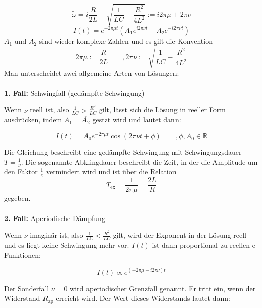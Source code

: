 \begin{equation*}
    \tilde{\omega} = i \frac{R}{2L} \pm \sqrt{\frac{1}{LC} - \frac{R^2}{4L^2}} := i2 \pi \mu \pm 2\pi \nu
\end{equation*}
\begin{equation}
    \label{eqn:RLC_lsg}
    I(t) = e^{-2 \pi \mu t} (A_1e^{i2 \pi \nu t} + A_2e^{-i2 \pi \nu t})
\end{equation}
$A_1$ und $A_2$ sind wieder komplexe Zahlen und es gilt die Konvention 
\begin{equation}
    \label{eqn:def_mu_nu}
    2\pi \mu := \frac{R}{2L} \qquad , 2\pi \nu := \sqrt{\frac{1}{LC}- \frac{R^2}{4L^2}}
\end{equation}
Man unterscheidet zwei allgemeine Arten von Lösungen:\\
\\
\textbf{1. Fall:} Schwingfall (gedämpfte Schwingung)

Wenn $\nu$ reell ist, also $\frac{1}{LC} > \frac{R^2}{LC}$ gilt, lässt sich die Lösung 
in reeller Form ausdrücken, indem $A_1 = \overline{A_2}$ gestzt wird und lautet dann:

\begin{equation}
    I(t) = A_0e^{-2\pi \mu t}\cos(2\pi \nu t + \phi) \qquad , \phi, A_0 \in \mathbb{R}
\end{equation}

Die Gleichung beschreibt eine gedämpfte Schwingung mit Schwingungsdauer $T = \frac{1}{\nu}$.
Die sogenannte Abklingdauer beschreibt die Zeit, in der die Amplitude um den Faktor $\frac{1}{e}$ vermindert
wird und ist über die Relation 
\begin{equation}
    \label{eqn:T_ex}
    T_\text{ex} = \frac{1}{2\pi\mu} = \frac{2L}{R}
\end{equation}
gegeben. \\
\\
\textbf{2. Fall:} Aperiodische Dämpfung

Wenn $\nu$ imaginär ist, also $\frac{1}{LC} < \frac{R^2}{LC}$ gilt, wird der Exponent in der Lösung reell
und es liegt keine Schwingung mehr vor. $I(t)$ ist dann proportional zu reellen e-Funktionen:

\begin{equation}
    I(t) \propto e^{(-2\pi\mu-i2\pi\nu)t}
\end{equation}

Der Sonderfall $\nu = 0$ wird aperiodischer Grenzfall genannt. Er tritt ein, wenn der Widerstand $R_\text{ap}$
erreicht wird. Der Wert dieses Widerstands lautet dann:

